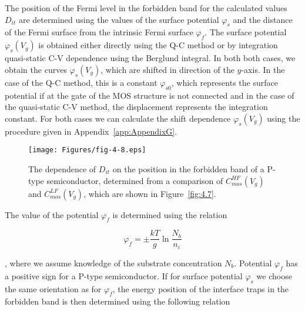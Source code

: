 \par The position of the Fermi level in the forbidden band for the
calculated values $D_{it}$ are determined using the values of the
surface potential $\varphi_{s}$ and the distance of the Fermi surface
from the intrinsic Fermi surface $\varphi_{f}$. The surface potential
$\varphi_{s} (V_{g})$ is obtained either directly using the Q-C method
or by integration quasi-static C-V dependence using the Berglund
integral. In both both cases, we obtain the curves
$\varphi_{s} (V_{g})$, which are shifted in direction of the
$y$-axis. In the case of the Q-C method, this is a constant
$\varphi_{s0}$, which represents the surface potential if at the gate
of the MOS structure is not connected and in the case of the
quasi-static C-V method, the displacement represents the integration
constant. For both cases we can calculate the shift dependence
$\varphi_{s} (V_{g})$ using the procedure given in
Appendix~\ref{app:AppendixG}.

\begin{figure}[h!]\centering
  \begin{minipage}[c]{\myfiguresize}
    \begin{center}
      \texttt{[image: Figures/fig-4-8.eps]}
      \caption[Dependence of $D_{it}$ on the position in the forbidden
        band of the semiconductor of a P-type semiconductor,
        determined from the comparison of $C_{mos}^{HF} (V_{g})$ and
        $C_{mos}^{LF} (V_{g})$]{The dependence of $D_{it}$ on the
        position in the forbidden band of a P-type semiconductor,
        determined from a comparison of $C_{mos}^{HF} (V_{g})$ and
        $C_{mos}^{LF} (V_{g})$, which are shown in
        Figure~\ref{fig:4.7}.}\label{fig:4.8}
    \end{center}
  \end{minipage}
\end{figure}

The value of the potential $\varphi_{f}$ is determined using the relation

\begin{equation}\label{eq:4.16}
  \varphi_{f} = \pm \frac{kT}{g} \ln{\frac{N_{b}}{n_{i}}}
\end{equation}

, where we assume knowledge of the substrate concentration
$N_{b}$. Potential $\varphi_{f}$ has a positive sign for a P-type
semiconductor. If for surface potential $\varphi_{s}$ we choose the
same orientation as for $\varphi_{f}$, the energy position of the
interface traps in the forbidden band is then determined using the
following relation

